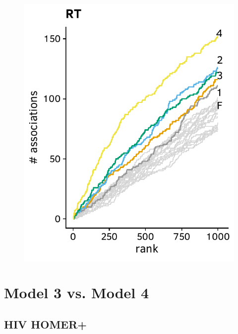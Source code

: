 \documentclass[a4paper,11pt]{article}
\begin{document}
\begin{figure}[H]
\begin{minipage}{.40\textwidth}
    \end{minipage}
    
    \vspace{0.5cm}

    \begin{minipage}{.40\textwidth}
        \includegraphics[width=\linewidth]{plots/comparison_plots/hiv_china/rt_new_map.pdf}
      \end{minipage}
\end{figure}

\section*{Model 3 vs. Model 4}

\subsection*{HIV HOMER+}
\end{document}
